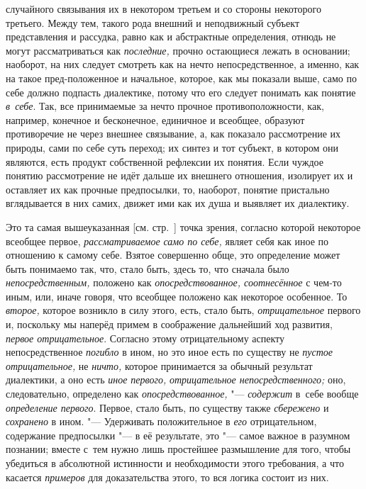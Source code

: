 случайного связывания их в некотором третьем и со стороны некоторого
третьего. Между тем, такого рода внешний и неподвижный субъект
представления и рассудка, равно как и абстрактные определения, отнюдь не
могут рассматриваться как {\em последние,} прочно
остающиеся лежать в основании; наоборот, на них следует
смотреть как на нечто непосредственное, а именно, как на такое
пред-положенное и начальное, которое, как мы показали выше, само по себе
должно подпасть диалектике, потому что его следует понимать как понятие
{\em в~себе}. Так, все
принимаемые за нечто прочное противоположности, как, например, конечное и
бесконечное, единичное и всеобщее, образуют противоречие не через внешнее
связывание, а, как показало рассмотрение их природы, сами по себе суть
переход; их синтез и тот субъект, в котором они являются, есть продукт
собственной рефлексии их понятия. Если чуждое понятию рассмотрение не идёт
дальше их внешнего отношения, изолирует их и оставляет их как прочные
предпосылки, то, наоборот, понятие пристально вглядывается в них самих,
движет ими как их душа и выявляет их диалектику.

Это та самая вышеуказанная [см. стр.~\pageref{bkm:bmpg224a}]
точка зрения, согласно которой некоторое всеобщее первое,
{\em рассматриваемое} {\em само по себе,} являет
себя как иное по отношению к самому себе. Взятое совершенно обще, это
определение может быть понимаемо так, что, стало быть, здесь то, что
сначала было {\em непосредственным,}
положено как {\em опосредствованное, соотнесённое} с
чем-то иным, или, иначе говоря, что всеобщее положено как некоторое
особенное. То {\em второе,}
которое возникло в силу этого, есть, стало быть, {\em отрицательное}
первого и, поскольку мы наперёд примем в соображение
дальнейший ход развития, {\em первое
отрицательное}. Согласно этому отрицательному аспекту
непосредственное {\em погибло}
в ином, но это иное есть по существу не
{\em пустое отрицательное,} не {\em ничто,}
которое принимается за обычный результат диалектики, а оно
есть {\em иное первого,}
{\em отрицательное непосредственного;} оно, следовательно, определено как
{\em опосредствованное,} "--- {\em содержит} в~себе
вообще {\em определение первого}. Первое, стало быть, по существу также
{\em сбережено} и {\em сохранено} в ином. "--- Удерживать положительное в
{\em его} отрицательном, содержание предпосылки "--- в её
результате,
это "--- самое важное в разумном познании; вместе
с~тем нужно лишь простейшее размышление для того, чтобы убедиться в
абсолютной истинности и необходимости этого требования, а что касается
{\em примеров} для доказательства этого, то вся логика состоит из них.

